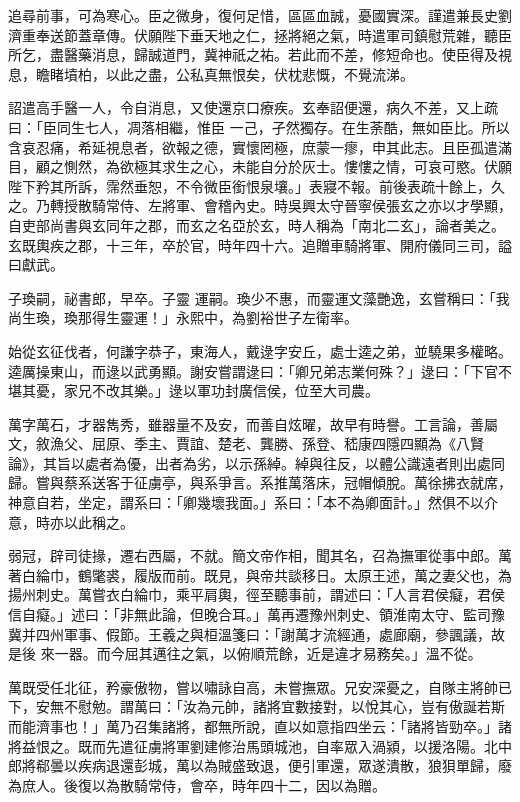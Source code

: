 \begin{pinyinscope}
 追尋前事，可為寒心。臣之微身，復何足惜，區區血誠，憂國實深。謹遣兼長史劉濟重奉送節蓋章傳。伏願陛下垂天地之仁，拯將絕之氣，時遣軍司鎮慰荒雜，聽臣所乞，盡醫藥消息，歸誠道門，冀神祇之祐。若此而不差，修短命也。使臣得及視息，瞻睹墳柏，以此之盡，公私真無恨矣，伏枕悲慨，不覺流涕。



 詔遣高手醫一人，令自消息，又使還京口療疾。玄奉詔便還，病久不差，又上疏曰：「臣同生七人，凋落相繼，惟臣
 一己，孑然獨存。在生荼酷，無如臣比。所以含哀忍痛，希延視息者，欲報之德，實懷罔極，庶蒙一瘳，申其此志。且臣孤遣滿目，顧之惻然，為欲極其求生之心，未能自分於灰士。慺慺之情，可哀可愍。伏願陛下矜其所訴，霈然垂恕，不令微臣銜恨泉壤。」表寢不報。前後表疏十餘上，久之。乃轉授散騎常侍、左將軍、會稽內史。時吳興太守晉寧侯張玄之亦以才學顯，自吏部尚書與玄同年之郡，而玄之名亞於玄，時人稱為「南北二玄」，論者美之。玄既輿疾之郡，十三年，卒於官，時年四十六。追贈車騎將軍、開府儀同三司，謚曰獻武。



 子瑍嗣，祕書郎，早卒。子靈
 運嗣。瑍少不惠，而靈運文藻艷逸，玄嘗稱曰：「我尚生瑍，瑍那得生靈運！」永熙中，為劉裕世子左衛率。



 始從玄征伐者，何謙字恭子，東海人，戴逯字安丘，處士逵之弟，並驍果多權略。逵厲操東山，而逯以武勇顯。謝安嘗謂逯曰：「卿兄弟志業何殊？」逯曰：「下官不堪其憂，家兄不改其樂。」逯以軍功封廣信侯，位至大司農。



 萬字萬石，才器雋秀，雖器量不及安，而善自炫曜，故早有時譽。工言論，善屬文，敘漁父、屈原、季主、賈誼、楚老、龔勝、孫登、嵇康四隱四顯為《八賢論》，其旨以處者為優，出者為劣，以示孫綽。綽與往反，以體公識遠者則出處同
 歸。嘗與蔡系送客于征虜亭，與系爭言。系推萬落床，冠帽傾脫。萬徐拂衣就席，神意自若，坐定，謂系曰：「卿幾壞我面。」系曰：「本不為卿面計。」然俱不以介意，時亦以此稱之。



 弱冠，辟司徒掾，遷右西屬，不就。簡文帝作相，聞其名，召為撫軍從事中郎。萬著白綸巾，鶴氅裘，履版而前。既見，與帝共談移日。太原王述，萬之妻父也，為揚州刺史。萬嘗衣白綸巾，乘平肩輿，徑至聽事前，謂述曰：「人言君侯癡，君侯信自癡。」述曰：「非無此論，但晚合耳。」萬再遷豫州刺史、領淮南太守、監司豫冀并四州軍事、假節。王羲之與桓溫箋曰：「謝萬才流經通，處廊廟，參諷議，故是後
 來一器。而今屈其邁往之氣，以俯順荒餘，近是違才易務矣。」溫不從。



 萬既受任北征，矜豪傲物，嘗以嘯詠自高，未嘗撫眾。兄安深憂之，自隊主將帥已下，安無不慰勉。謂萬曰：「汝為元帥，諸將宜數接對，以悅其心，豈有傲誕若斯而能濟事也！」萬乃召集諸將，都無所說，直以如意指四坐云：「諸將皆勁卒。」諸將益恨之。既而先遣征虜將軍劉建修治馬頭城池，自率眾入渦潁，以援洛陽。北中郎將郗曇以疾病退還彭城，萬以為賊盛致退，便引軍還，眾遂潰散，狼狽單歸，廢為庶人。後復以為散騎常侍，會卒，時年四十二，因以為贈。




\end{pinyinscope}

